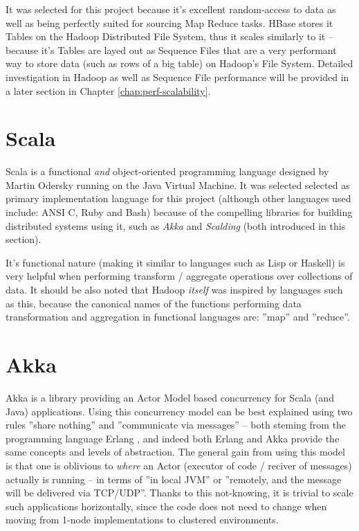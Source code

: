 It was selected for this project because it's excellent random-access to data as well as being perfectly suited for sourcing Map Reduce tasks. HBase stores it Tables on the Hadoop Distributed File System, thus it scales similarly to it -- because it's Tables are layed out as Sequence Files that are a very performant way to store data (such as rows of a big table) on Hadoop's File System. Detailed investigation in Hadoop as well as Sequence File performance will be provided in a later section in Chapter \ref{chap:perf-scalability}.

\section{Scala}
\label{sec:scala}
Scala is a functional \textit{and} object-oriented programming language designed by Martin Odersky \cite{scala} running on the Java Virtual Machine. It was selected selected as primary implementation language for this project (although other languages used include: ANSI C, Ruby and Bash) because of the compelling libraries for building distributed systems using it, such as \textit{Akka} and \textit{Scalding} (both introduced in this section).

It's functional nature (making it similar to languages such as Lisp or Haskell) is very helpful when performing transform / aggregate operations over collections of data. It should be also noted that Hadoop \textit{itself} was inspired by languages such as this, because the canonical names of the functions performing data transformation and aggregation in functional languages are: ''map'' and ''reduce''.

\section{Akka}
\label{sec:akka}

Akka is a library providing an Actor Model \cite{actor-model} based concurrency for Scala (and Java) applications. 
Using this concurrency model can be best explained using two rules ''share nothing'' and ''communicate via messages'' -- both steming from the programming language Erlang \cite{erlang}, and indeed both Erlang and Akka provide the same concepts and levels of abstraction. The general gain from using this model is that one is oblivious to \textit{where} an Actor (executor of code / reciver of messages) actually is running -- in terms of ''in local JVM'' or ''remotely, and the message will be delivered via TCP/UDP''. Thanks to this not-knowing, it is trivial to scale such applications horizontally, since the code does not need to change when moving from 1-node implementations to clustered environments.

